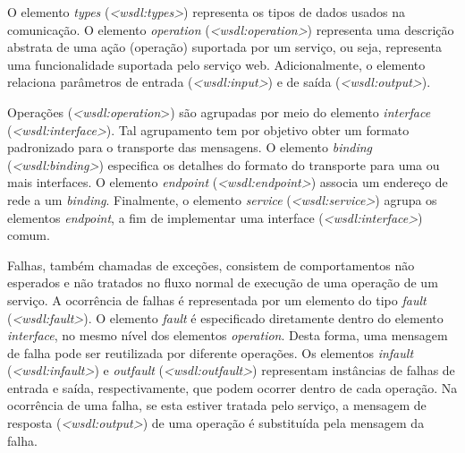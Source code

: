 O elemento \textit{types} (\textit{<wsdl:types>}) representa os tipos de dados usados na comunicação. O elemento \textit{operation} (\textit{<wsdl:operation>}) representa uma descrição abstrata de uma ação (operação) suportada por um serviço, ou seja, representa uma funcionalidade suportada pelo serviço web. Adicionalmente, o elemento relaciona parâmetros de entrada (\textit{<wsdl:input>}) e de saída (\textit{<wsdl:output>}).

Operações (\textit{<wsdl:operation}>) são agrupadas por meio do elemento \textit{interface} (\textit{<wsdl:interface>}). Tal agrupamento tem por objetivo obter um formato padronizado para o transporte das mensagens. O elemento \textit{binding} (\textit{<wsdl:binding>}) especifica os detalhes do formato do transporte para uma ou mais interfaces. O elemento \textit{endpoint} (\textit{<wsdl:endpoint>}) associa um endereço de rede a um \textit{binding}. Finalmente, o elemento \textit{service} (\textit{<wsdl:service>}) agrupa os elementos \textit{endpoint}, a fim de implementar uma interface (\textit{<wsdl:interface>}) comum.

Falhas, também chamadas de exceções, consistem de comportamentos não esperados e não tratados no fluxo normal de execução de uma operação de um serviço. A ocorrência de falhas é representada por um elemento do tipo \textit{fault} (\textit{<wsdl:fault>}). O elemento \textit{fault} é especificado diretamente dentro do elemento \textit{interface}, no mesmo nível dos elementos \textit{operation}. Desta forma, uma mensagem de falha pode ser reutilizada por diferente operações. Os elementos \textit{infault} (\textit{<wsdl:infault>}) e \textit{outfault} (\textit{<wsdl:outfault>}) representam instâncias de falhas de entrada e saída, respectivamente, que podem ocorrer dentro de cada operação. Na ocorrência de uma falha, se esta estiver tratada pelo serviço, a mensagem de resposta (\textit{<wsdl:output>}) de uma operação é substituída pela mensagem da falha.


